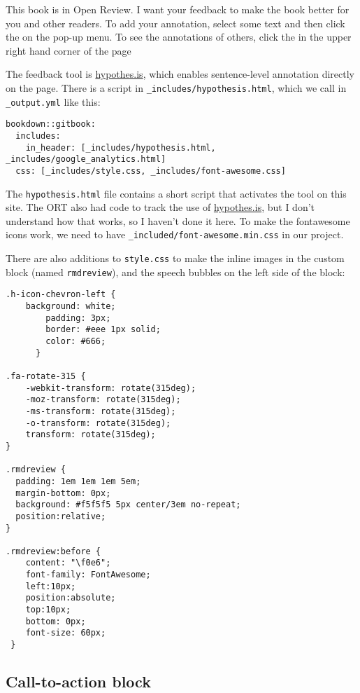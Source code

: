 \documentclass[]{book}
\let\BeginKnitrBlock\begin \let\EndKnitrBlock\end
\begin{document}
\BeginKnitrBlock{rmdreview}
This book is in Open Review. I want your feedback to make the book
better for you and other readers. To add your annotation, {select some
text} and then click the on the pop-up menu. To see the annotations of
others, click the in the upper right hand corner of the page
\EndKnitrBlock{rmdreview}

The feedback tool is \href{https://hypothes.is/}{hypothes.is}, which
enables sentence-level annotation directly on the page. There is a
script in \texttt{\_includes/hypothesis.html}, which we call in
\texttt{\_output.yml} like this:

\begin{verbatim}
bookdown::gitbook:
  includes:
    in_header: [_includes/hypothesis.html, _includes/google_analytics.html]
  css: [_includes/style.css, _includes/font-awesome.css]
\end{verbatim}

The \texttt{hypothesis.html} file contains a short script that activates
the tool on this site. The ORT also had code to track the use of
\href{https://hypothes.is/}{hypothes.is}, but I don't understand how
that works, so I haven't done it here. To make the fontawesome icons
work, we need to have \texttt{\_included/font-awesome.min.css} in our
project.

There are also additions to \texttt{style.css} to make the inline images
in the custom block (named \texttt{rmdreview}), and the speech bubbles
on the left side of the block:

\begin{verbatim}
.h-icon-chevron-left {
    background: white;
        padding: 3px;
        border: #eee 1px solid;
        color: #666;
      }

.fa-rotate-315 {
    -webkit-transform: rotate(315deg);
    -moz-transform: rotate(315deg);
    -ms-transform: rotate(315deg);
    -o-transform: rotate(315deg);
    transform: rotate(315deg);
}

.rmdreview {
  padding: 1em 1em 1em 5em;
  margin-bottom: 0px;
  background: #f5f5f5 5px center/3em no-repeat;
  position:relative;
}

.rmdreview:before {
    content: "\f0e6";
    font-family: FontAwesome;
    left:10px;
    position:absolute;
    top:10px;
    bottom: 0px;
    font-size: 60px;
 }
\end{verbatim}

\subsection{Call-to-action block}\label{call-to-action-block}
\end{document}
